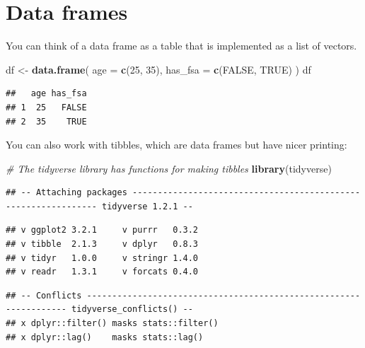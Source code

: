 \documentclass[openany]{book}
\newenvironment{Shaded}{\begin{snugshade}}{\end{snugshade}}
\newcommand{\CommentTok}[1]{\textcolor[rgb]{0.56,0.35,0.01}{\textit{#1}}}
\newcommand{\DataTypeTok}[1]{\textcolor[rgb]{0.13,0.29,0.53}{#1}}
\newcommand{\DecValTok}[1]{\textcolor[rgb]{0.00,0.00,0.81}{#1}}
\newcommand{\KeywordTok}[1]{\textcolor[rgb]{0.13,0.29,0.53}{\textbf{#1}}}
\newcommand{\NormalTok}[1]{#1}
\newcommand{\OtherTok}[1]{\textcolor[rgb]{0.56,0.35,0.01}{#1}}
\newcommand{\StringTok}[1]{\textcolor[rgb]{0.31,0.60,0.02}{#1}}
\begin{document}
\hypertarget{data-frames}{%
\section{Data frames}\label{data-frames}}

You can think of a data frame as a table that is implemented as a list of vectors.

\begin{Shaded}
\begin{Highlighting}[]
\NormalTok{df <-}\StringTok{ }\KeywordTok{data.frame}\NormalTok{(}
  \DataTypeTok{age =} \KeywordTok{c}\NormalTok{(}\DecValTok{25}\NormalTok{, }\DecValTok{35}\NormalTok{),}
  \DataTypeTok{has_fsa =} \KeywordTok{c}\NormalTok{(}\OtherTok{FALSE}\NormalTok{, }\OtherTok{TRUE}\NormalTok{)}
\NormalTok{)}
\NormalTok{df}
\end{Highlighting}
\end{Shaded}

\begin{verbatim}
##   age has_fsa
## 1  25   FALSE
## 2  35    TRUE
\end{verbatim}

You can also work with tibbles, which are data frames but have nicer printing:

\begin{Shaded}
\begin{Highlighting}[]
\CommentTok{# The tidyverse library has functions for making tibbles}
\KeywordTok{library}\NormalTok{(tidyverse) }
\end{Highlighting}
\end{Shaded}

\begin{verbatim}
## -- Attaching packages --------------------------------------------------------------- tidyverse 1.2.1 --
\end{verbatim}

\begin{verbatim}
## v ggplot2 3.2.1     v purrr   0.3.2
## v tibble  2.1.3     v dplyr   0.8.3
## v tidyr   1.0.0     v stringr 1.4.0
## v readr   1.3.1     v forcats 0.4.0
\end{verbatim}

\begin{verbatim}
## -- Conflicts ------------------------------------------------------------------ tidyverse_conflicts() --
## x dplyr::filter() masks stats::filter()
## x dplyr::lag()    masks stats::lag()
\end{verbatim}
\end{document}

